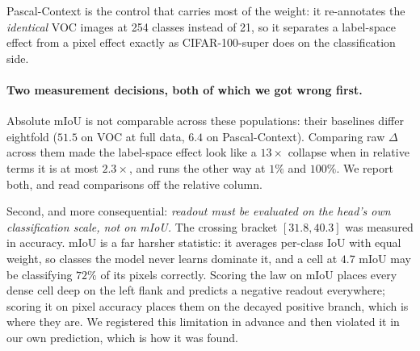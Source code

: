 Pascal-Context is the control that carries most of the weight: it
re-annotates the \emph{identical} VOC images at 254 classes instead of 21, so
it separates a label-space effect from a pixel effect exactly as
CIFAR-100-super does on the classification side.

\paragraph{Two measurement decisions, both of which we got wrong first.}
Absolute mIoU is not comparable across these populations: their baselines
differ eightfold ($51.5$ on VOC at full data, $6.4$ on Pascal-Context).
Comparing raw $\Delta$ across them made the label-space effect look like a
$13\times$ collapse when in relative terms it is at most $2.3\times$, and runs
the other way at $1\%$ and $100\%$.
We report both, and read comparisons off the relative column.

Second, and more consequential: \emph{readout must be evaluated on the
head's own classification scale, not on mIoU.} The crossing bracket
$[31.8, 40.3]$ was measured in accuracy. mIoU is a far harsher statistic: it
averages per-class IoU with equal weight, so classes the model never learns
dominate it, and a cell at $4.7$ mIoU may be classifying $72\%$ of its pixels
correctly. Scoring the law on mIoU places every dense cell deep on
the left flank and predicts a negative readout everywhere; scoring it on
pixel accuracy places them on the decayed positive branch, which is where
they are. We registered this limitation in advance and then violated it in our
own prediction, which is how it was found.

